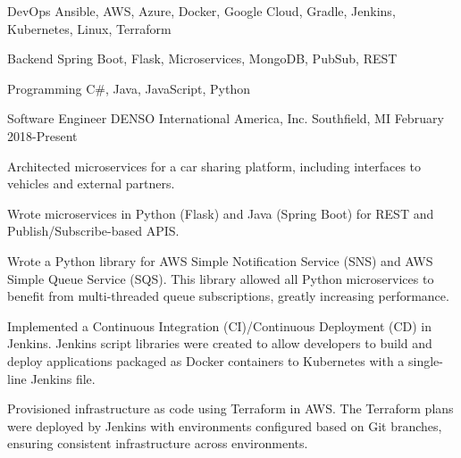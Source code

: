 \documentclass[11pt, a4paper]{awesome-cv}
\begin{document}
\makecvheader[C]


\begin{cvskills}
    \cvskill
    {DevOps}
    {Ansible, AWS, Azure, Docker, Google Cloud, Gradle, Jenkins, Kubernetes, Linux, Terraform}

    \cvskill
    {Backend}
    {Spring Boot, Flask, Microservices, MongoDB, PubSub, REST}

    \cvskill
    {Programming}
    {C\#, Java, JavaScript, Python}
\end{cvskills}

\begin{cventries}
    \cventry
    {Software Engineer}
    {DENSO International America, Inc.}
    {Southfield, MI}
    {February 2018-Present}
    {
        \begin{cvitems}
            \item{Architected microservices for a car sharing platform, including interfaces to vehicles and external partners.}
            \item{Wrote microservices in Python (Flask) and Java (Spring Boot) for REST and Publish/Subscribe-based APIS.}
            \item{Wrote a Python library for AWS Simple Notification Service (SNS) and AWS Simple Queue Service (SQS). This library allowed all Python microservices to benefit from multi-threaded queue subscriptions, greatly increasing performance.}
            \item{Implemented a Continuous Integration (CI)/Continuous Deployment (CD) in Jenkins. Jenkins script libraries were created to allow developers to build and deploy applications packaged as Docker containers to Kubernetes with a single-line Jenkins file.}
            \item{Provisioned infrastructure as code using Terraform in AWS. The Terraform plans were deployed by Jenkins with environments configured based on Git branches, ensuring consistent infrastructure across environments.}
        \end{cvitems}
    }


\end{cventries}
\end{document}
